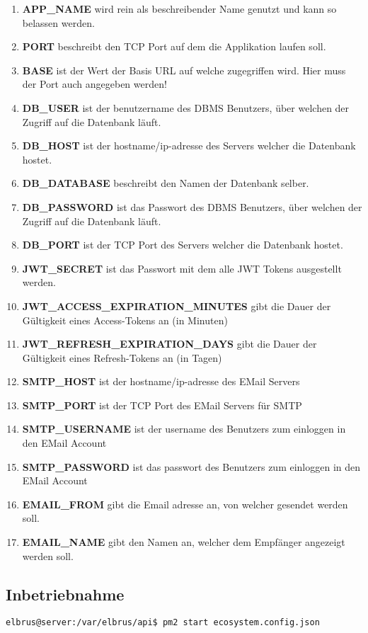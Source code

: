 	\begin{enumerate}
		\item \textbf{APP\_NAME} wird rein als beschreibender Name genutzt und kann so belassen werden.
		\item \textbf{PORT} beschreibt den TCP Port auf dem die Applikation laufen soll.
		\item \textbf{BASE} ist der Wert der Basis URL auf welche zugegriffen wird. Hier muss der Port auch angegeben werden!
		\item \textbf{DB\_USER} ist der benutzername des DBMS Benutzers, über welchen der Zugriff auf die Datenbank läuft.
		\item \textbf{DB\_HOST} ist der hostname/ip-adresse des Servers welcher die Datenbank hostet.
		\item \textbf{DB\_DATABASE} beschreibt den Namen der Datenbank selber.
		\item \textbf{DB\_PASSWORD} ist das Passwort des DBMS Benutzers, über welchen der Zugriff auf die Datenbank läuft.
		\item \textbf{DB\_PORT} ist der TCP Port des Servers welcher die Datenbank hostet.
		\item \textbf{JWT\_SECRET} ist das Passwort mit dem alle JWT Tokens ausgestellt werden.
		\item \textbf{JWT\_ACCESS\_EXPIRATION\_MINUTES} gibt die Dauer der Gültigkeit eines Access-Tokens an (in Minuten)
		\item \textbf{JWT\_REFRESH\_EXPIRATION\_DAYS} gibt die Dauer der Gültigkeit eines Refresh-Tokens an (in Tagen)
		\item \textbf{SMTP\_HOST} ist der hostname/ip-adresse des EMail Servers
		\item \textbf{SMTP\_PORT} ist der TCP Port des EMail Servers für SMTP
		\item \textbf{SMTP\_USERNAME} ist der username des Benutzers zum einloggen in den EMail Account
		\item \textbf{SMTP\_PASSWORD} ist das passwort des Benutzers zum einloggen in den EMail Account
		\item \textbf{EMAIL\_FROM} gibt die Email adresse an, von welcher gesendet werden soll.
		\item \textbf{EMAIL\_NAME} gibt den Namen an, welcher dem Empfänger angezeigt werden soll.
	\end{enumerate}

	\subsection{Inbetriebnahme}
	
	\lstset{style=commands}
	\begin{lstlisting}[caption={Starten der API.}]
		elbrus@server:/var/elbrus/api$ pm2 start ecosystem.config.json
	\end{lstlisting}